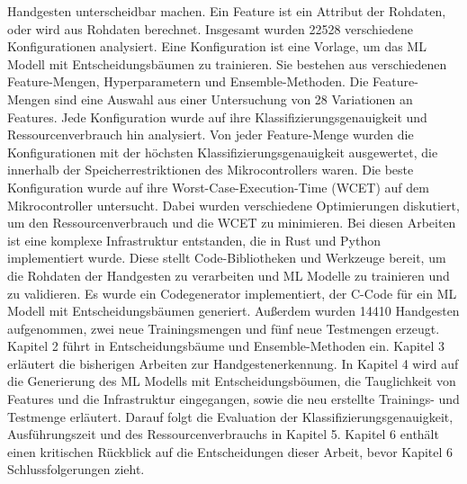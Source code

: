 Handgesten unterscheidbar machen. Ein Feature ist ein Attribut der Rohdaten, oder wird aus Rohdaten berechnet.
\newline
\newline
Insgesamt wurden 22528 verschiedene Konfigurationen analysiert. Eine Konfiguration ist eine Vorlage, um das ML Modell mit Entscheidungsbäumen zu trainieren. Sie bestehen aus verschiedenen Feature-Mengen,
Hyperparametern und Ensemble-Methoden. Die Feature-Mengen sind eine Auswahl aus einer Untersuchung von 28 Variationen an Features. Jede Konfiguration wurde auf ihre Klassifizierungsgenauigkeit und Ressourcenverbrauch
hin analysiert. Von jeder Feature-Menge wurden die Konfigurationen mit der höchsten Klassifizierungsgenauigkeit ausgewertet, die innerhalb der Speicherrestriktionen des Mikrocontrollers waren. Die beste
Konfiguration wurde auf ihre Worst-Case-Execution-Time (WCET) auf dem Mikrocontroller untersucht. Dabei wurden verschiedene Optimierungen diskutiert, um den Ressourcenverbrauch und die WCET zu minimieren.
Bei diesen Arbeiten ist eine komplexe Infrastruktur entstanden, die in Rust und Python implementiert wurde. Diese stellt Code-Bibliotheken und Werkzeuge bereit, um die Rohdaten der Handgesten zu verarbeiten und
ML Modelle zu trainieren und zu validieren. Es wurde ein Codegenerator implementiert, der C-Code für ein ML Modell mit Entscheidungsbäumen generiert. Außerdem wurden 14410 Handgesten aufgenommen,
zwei neue Trainingsmengen und fünf neue Testmengen erzeugt.
\newline
\newline
Kapitel 2 führt in Entscheidungsbäume und Ensemble-Methoden ein. Kapitel 3 erläutert die bisherigen Arbeiten zur Handgestenerkennung. In Kapitel 4 wird auf die Generierung des ML Modells mit Entscheidungsböumen,
die Tauglichkeit von Features und die Infrastruktur eingegangen, sowie die neu erstellte Trainings- und Testmenge erläutert. Darauf folgt die Evaluation der Klassifizierungsgenauigkeit, Ausführungszeit
und des Ressourcenverbrauchs in Kapitel 5. Kapitel 6 enthält einen kritischen Rückblick auf die Entscheidungen dieser Arbeit, bevor Kapitel 6 Schlussfolgerungen zieht.